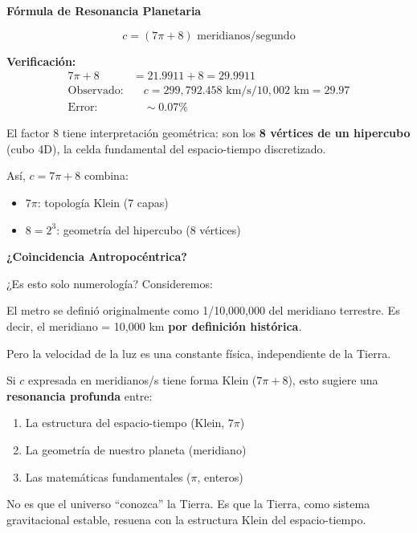 \begin{nivelmatematico}
\textbf{Fórmula de Resonancia Planetaria}

\begin{equation}
\boxed{c = (7\pi + 8) \text{ meridianos/segundo}}
\end{equation}

\textbf{Verificación:}
\begin{align}
7\pi + 8 &= 21.9911 + 8 = 29.9911\\
\text{Observado:} & \quad c = 299,792.458 \text{ km/s} / 10,002 \text{ km} = 29.97\\
\text{Error:} & \quad \sim 0.07\%
\end{align}

El factor 8 tiene interpretación geométrica: son los \textbf{8 vértices de un hipercubo}
(cubo 4D), la celda fundamental del espacio-tiempo discretizado.

Así, $c = 7\pi + 8$ combina:
\begin{itemize}
    \item $7\pi$: topología Klein (7 capas)
    \item $8 = 2^3$: geometría del hipercubo (8 vértices)
\end{itemize}
\end{nivelmatematico}

\begin{nivelconceptual}
\textbf{¿Coincidencia Antropocéntrica?}

¿Es esto solo numerología? Consideremos:

El metro se definió originalmente como 1/10,000,000 del meridiano terrestre.
Es decir, el meridiano = 10,000 km \textbf{por definición histórica}.

Pero la velocidad de la luz es una constante física, independiente de la Tierra.

Si $c$ expresada en meridianos/s tiene forma Klein ($7\pi + 8$),
esto sugiere una \textbf{resonancia profunda} entre:
\begin{enumerate}
    \item La estructura del espacio-tiempo (Klein, $7\pi$)
    \item La geometría de nuestro planeta (meridiano)
    \item Las matemáticas fundamentales ($\pi$, enteros)
\end{enumerate}

No es que el universo ``conozca'' la Tierra.
Es que la Tierra, como sistema gravitacional estable,
resuena con la estructura Klein del espacio-tiempo.
\end{nivelconceptual}


